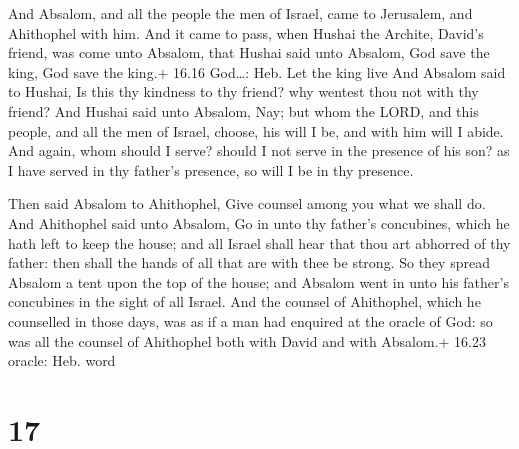  And Absalom, and all the people the men of Israel, came
to Jerusalem, and Ahithophel with him.  And it came to
pass, when Hushai the Archite, David's friend, was come unto Absalom,
that Hushai said unto Absalom, God save the king, God save the king.+
16.16 God\ldots: Heb. Let the king live  And Absalom said
to Hushai, Is this thy kindness to thy friend? why wentest thou not with
thy friend?  And Hushai said unto Absalom, Nay; but whom
the LORD, and this people, and all the men of Israel, choose, his will I
be, and with him will I abide.  And again, whom should I
serve? should I not serve in the presence of his son? as I have served
in thy father's presence, so will I be in thy presence.

 Then said Absalom to Ahithophel, Give counsel among you
what we shall do.  And Ahithophel said unto Absalom, Go in
unto thy father's concubines, which he hath left to keep the house; and
all Israel shall hear that thou art abhorred of thy father: then shall
the hands of all that are with thee be strong.  So they
spread Absalom a tent upon the top of the house; and Absalom went in
unto his father's concubines in the sight of all Israel. 
And the counsel of Ahithophel, which he counselled in those days, was as
if a man had enquired at the oracle of God: so was all the counsel of
Ahithophel both with David and with Absalom.+ 16.23 oracle: Heb. word

\hypertarget{section-16}{%
\section{17}\label{section-16}}

